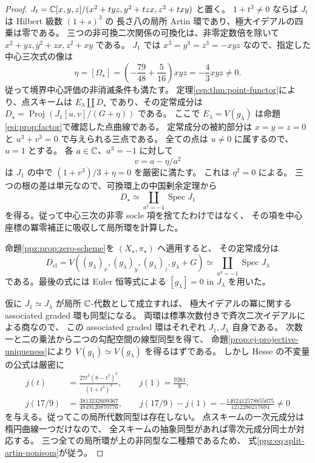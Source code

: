 \begin{proof}
$J_t=\mathbb C[x,y,z]/(x^2+tyz,y^2+tzx,z^2+txy)$ と置く。
$1+t^3\ne0$ ならば $J_t$ は Hilbert 級数 $(1+s)^3$ の
長さ八の局所 Artin 環であり、極大イデアルの四乗は零である。
三つの非可換二次関係の可換化は、非零定数倍を除いて
$x^2+yz,y^2+zx,z^2+xy$ である。
$J_1$ では $x^3=y^3=z^3=-xyz$ なので、指定した中心三次式の像は
\[
 \eta=[\Omega_\star]
   =\left(-\frac{79}{48}+\frac5{16}\right)xyz
   =-\frac43xyz\ne0.
\]
従って境界中心評価の非消滅条件も満たす。
定理\ref{csp:thm:point-functor}により、点スキームは
$E_\lambda\amalg D_\star$ であり、その定常成分は
$D_\star=\operatorname{Proj}(J_1[u,v]/(G+\eta))$ である。
ここで $E_\lambda=V(g_\lambda)$ は命題\ref{esi:prop:factor}で確認した点曲線である。
定常成分の被約部分は
$x=y=z=0$ と $u^3+v^3=0$ で与えられる三点である。
全ての点は $u\ne0$ に属するので、$u=1$ とする。
各 $a\in\mathbb C$、$a^3=-1$ に対して
\[
 v=a-\eta/a^2
\]
は $J_1$ の中で $(1+v^3)/3+\eta=0$ を厳密に満たす。
これは $\eta^2=0$ による。
三つの根の差は単元なので、可換環上の中国剰余定理から
\begin{equation}\label{ppz:eq:source-local-artin}
 D_\star\simeq\coprod_{a^3=-1}\operatorname{Spec}J_1
\end{equation}
を得る。従って中心三次の非零 socle 項を捨てたわけではなく、
その項を中心座標の冪零補正に吸収して局所環を計算した。

命題\ref{ppz:prop:zero-scheme}を $(X_\star,\pi_\star)$ へ適用すると、
その定常成分は
\[
 D_{\mathrm{cl}}=V((g_\lambda)_x,(g_\lambda)_y,(g_\lambda)_z,g_\lambda+G)
 \simeq\coprod_{a^3=-1}\operatorname{Spec}J_\lambda
\]
である。最後の式には Euler 恒等式による $[g_\lambda]=0$ in $J_\lambda$
を用いた。

仮に $J_1\simeq J_\lambda$ が局所 $\mathbb C$-代数として成立すれば、
極大イデアルの冪に関する associated graded 環も同型になる。
両環は標準次数付きで斉次二次イデアルによる商なので、
この associated graded 環はそれぞれ $J_1,J_\lambda$ 自身である。
次数一と二の乗法から二つの勾配空間の線型同型を得て、
命題\ref{prop:ej-projective-uniqueness}により
$V(g_1)\simeq V(g_\lambda)$ を得るはずである。
しかし Hesse の不変量の公式は厳密に
\begin{equation}\label{ppz:eq:explicit-j}
 \begin{split}
 j(t)&=\frac{27t^3(8-t^3)^3}{(1+t^3)^3},\qquad j(1)=\frac{9261}{8},\\
 j(17/9)&=\frac{3813232609367}{4849120870776},\qquad
 j(17/9)-j(1)=-\frac{1402412578855675}{1212280217694}\ne0
 \end{split}
\end{equation}
を与える。従ってこの局所代数同型は存在しない。
点スキームの一次元成分は楕円曲線一つだけなので、
全スキームの抽象同型があれば零次元成分同士が対応する。
三つ全ての局所環が上の非同型な二種類であるため、
式\eqref{ppz:eq:split-artin-nonisom}が従う。


\end{proof}
